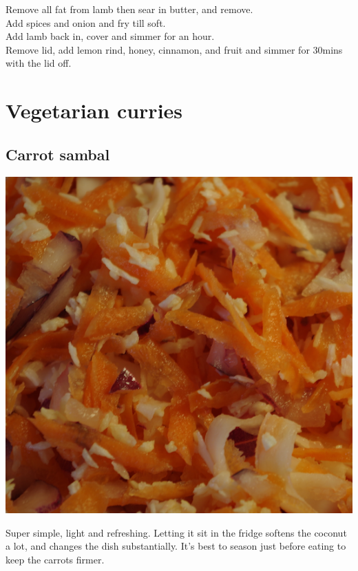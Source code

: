 \documentclass{tufte-book}
\begin{document}
\smallskip
Remove all fat from lamb then sear in butter, and remove.
\\Add spices and onion and fry till soft.
\\Add lamb back in, cover and simmer for an hour.
\\Remove lid, add lemon rind, honey, cinnamon, and fruit and simmer for 30mins with the lid off.


\chapter{Vegetarian curries}

\section{Carrot sambal}

\begin{marginfigure}%
  \includegraphics[width=\linewidth]{carrotraita.png}
\end{marginfigure}

Super simple, light and refreshing. Letting it sit in the fridge softens the coconut a lot, and changes the dish substantially. It's best to season just before eating to keep the carrots firmer.
\end{document}
